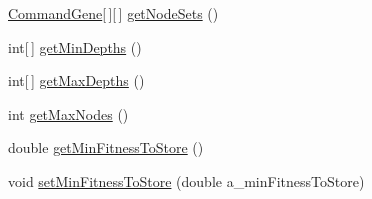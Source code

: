 \begin{DoxyCompactItemize}
\hyperlink{classorg_1_1jgap_1_1gp_1_1_command_gene}{Command\-Gene}\mbox{[}$\,$\mbox{]}\mbox{[}$\,$\mbox{]} \hyperlink{classorg_1_1jgap_1_1distr_1_1grid_1_1gp_1_1_grid_configuration_g_p_base_ab39324118ee5bd6cf2998a88ba226200}{get\-Node\-Sets} ()
\item 
int\mbox{[}$\,$\mbox{]} \hyperlink{classorg_1_1jgap_1_1distr_1_1grid_1_1gp_1_1_grid_configuration_g_p_base_af9ee847d6132e5f8e376ca43c28bdd43}{get\-Min\-Depths} ()
\item 
int\mbox{[}$\,$\mbox{]} \hyperlink{classorg_1_1jgap_1_1distr_1_1grid_1_1gp_1_1_grid_configuration_g_p_base_a6899282a492b2c63647304be83a4482c}{get\-Max\-Depths} ()
\item 
int \hyperlink{classorg_1_1jgap_1_1distr_1_1grid_1_1gp_1_1_grid_configuration_g_p_base_ac0c6253566f835f666a69d2c2d6f781a}{get\-Max\-Nodes} ()
\item 
double \hyperlink{classorg_1_1jgap_1_1distr_1_1grid_1_1gp_1_1_grid_configuration_g_p_base_afc71408182604b3bce559999fe24ef05}{get\-Min\-Fitness\-To\-Store} ()
\item 
void \hyperlink{classorg_1_1jgap_1_1distr_1_1grid_1_1gp_1_1_grid_configuration_g_p_base_a0ae35fcd75ddce3bf027c52df772a169}{set\-Min\-Fitness\-To\-Store} (double a\-\_\-min\-Fitness\-To\-Store)
\end{DoxyCompactItemize}
